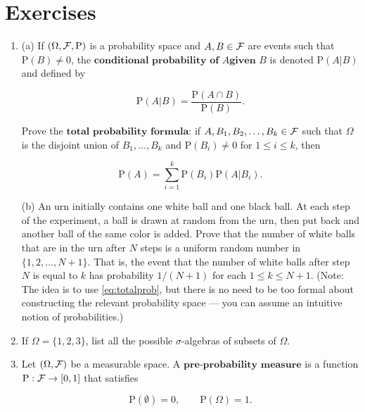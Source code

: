\chapter*{Exercises}

\begin{enumerate}[label=\arabic*.]
\item (a) If $(\Omega, {\cal F}, \mathrm{P})$ is a
probability space and $A, B\in {\cal F}$ are events
such that $\mathrm{P}(B)\neq 0$, the
$\textbf{conditional probability of } A \textbf{
given } B$
is denoted $\mathrm{P}(A | B)$ and defined by

\[
\mathrm{P}(A | B) = \frac{\mathrm{P}(A \cap B)}{\mathrm{P}(B)}.
\]

\noindent Prove the $\textbf{total probability formula:}$ if
$A,B_1,B_2,\ldots,B_k \in {\cal F}$ such that $\Omega$
is the disjoint union of $B_1,\ldots, B_k$ and
$\mathrm{P}(B_i) \neq 0$ for $1\le i\le k$, then

\begin{equation*}
\tag{21}\label{eq:totalprob}
\mathrm{P}(A) = \sum_{i=1}^k \mathrm{P}(B_i) \mathrm{P}(A | B_i).
\end{equation*}

\noindent (b) An urn initially contains one white ball and one
black ball. At each step of the experiment, a ball is
drawn at random from the urn, then put back and
another ball of the same color is added. Prove that
the number of white balls that are in the urn after
$N$ steps is a uniform random number in
$\{1,2,\ldots,N+1\}$. That is, the event that the
number of white balls after step $N$ is equal to $k$
has probability $1/(N+1)$ for each $1\le k\le N+1$.
(Note: The idea is to use \eqref{eq:totalprob}, but there
is no need to be too formal about constructing the
relevant probability space --- you can assume an
intuitive notion of probabilities.)

\item If $\Omega=\{1,2,3\}$, list all the possible
$\sigma$-algebras of subsets of $\Omega$.

\item Let $(\Omega, {\cal F})$ be a measurable space. A
$\textbf{pre-probability measure}$ is a function
$\mathrm{P}:{\cal F}\to [0,1]$ that satisfies

\begin{equation*}
\tag{22}\label{eq:P1}
\mathrm{P}(\emptyset) = 0, \qquad \mathrm{P}(\Omega) = 1.
\end{equation*}


\end{enumerate}
